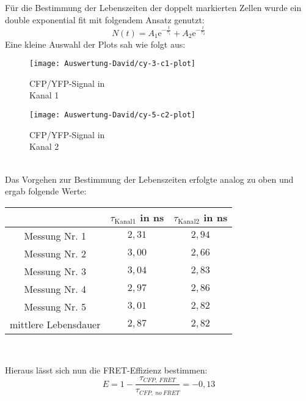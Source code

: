 \newpage
Für die Bestimmung der Lebenszeiten der doppelt markierten Zellen wurde ein double exponential fit mit folgendem Ansatz genutzt:\\
\begin{equation}
N(t) = A_{1} \mathrm{e}^{-\frac{t}{\tau_1}}+A_{2} \mathrm{e}^{-\frac{t}{\tau_2}}
\end{equation}
Eine kleine Auswahl der Plots sah wie folgt aus:\\
\begin{figure}[h]
	\begin{minipage}{.4\linewidth} %
		\texttt{[image: Auswertung-David/cy-3-c1-plot]}
		\caption{CFP/YFP-Signal in \\Kanal 1}
	\end{minipage}
	\hspace{.1\linewidth}%
	\begin{minipage}{.4\linewidth} %
		\texttt{[image: Auswertung-David/cy-5-c2-plot]}
		\caption{CFP/YFP-Signal in \\Kanal 2}
	\end{minipage}
\end{figure}\\
Das Vorgehen zur Bestimmung der Lebenszeiten erfolgte analog zu oben und ergab folgende Werte:\\
\begin{center} 
	\begin{tabular}[c]{ccc}
		\hline
		& $\tau_{\mathrm{Kanal 1}}$ in ns & $\tau_{\mathrm{Kanal 2}}$ in ns \\
		\hline
		Messung Nr. 1 & $2,31$ & $2,94$ \\
		Messung Nr. 2 & $3,00$ & $2,66$ \\
		Messung Nr. 3 & $3,04$ & $2,83$ \\
		Messung Nr. 4 & $2,97$ & $2,86$ \\
		Messung Nr. 5 & $3,01$ & $2,82$ \\
		\hline
		mittlere Lebensdauer & $2,87$ & $2,82$\\
		\hline
	\end{tabular}\\
\end{center}
Hieraus lässt sich nun die FRET-Effizienz bestimmen:\\
\begin{equation}
E = 1-\frac{\tau_{CFP,\:FRET}}{\tau_{CFP,\:no\:FRET}}=-0,13
\end{equation}
